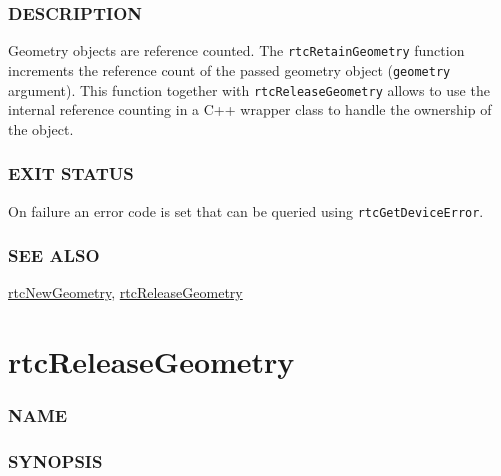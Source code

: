 \subsubsection{DESCRIPTION}\label{description}

Geometry objects are reference counted. The \texttt{rtcRetainGeometry}
function increments the reference count of the passed geometry object
(\texttt{geometry} argument). This function together with
\texttt{rtcReleaseGeometry} allows to use the internal reference
counting in a C++ wrapper class to handle the ownership of the object.

\subsubsection{EXIT STATUS}\label{exit-status}

On failure an error code is set that can be queried using
\texttt{rtcGetDeviceError}.

\subsubsection{SEE ALSO}\label{see-also}

\hyperref[rtcnewgeometry]{rtcNewGeometry},
\hyperref[rtcreleasegeometry]{rtcReleaseGeometry}

\pagebreak

\section{rtcReleaseGeometry}\label{rtcreleasegeometry}

\subsubsection{NAME}\label{name}

\begin{Shaded}
\begin{Highlighting}[]
\OperatorTok{{-}}
\end{Highlighting}
\end{Shaded}

\subsubsection{SYNOPSIS}\label{synopsis}

\begin{Shaded}
\begin{Highlighting}[]

\OperatorTok{(}\OperatorTok{);}
\end{Highlighting}
\end{Shaded}

